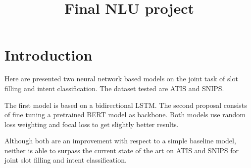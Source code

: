 \documentclass[a4paper]{article}
\title{Final NLU project}
\begin{document}
\maketitle


\section{Introduction}
    Here are presented two neural network based models on the joint task of slot filling and intent classification. The dataset tested are ATIS and SNIPS.
    
    The first model is based on a bidirectional LSTM. 
    The second proposal consists of fine tuning a pretrained BERT model as backbone.
    Both models use random loss weighting and focal loss to get slightly better results.
    
    Although both are an improvement with respect to a simple baseline model, neither is able to surpass the current state of the art on ATIS and SNIPS for joint slot filling and intent classification. 
        
    
\end{document}
